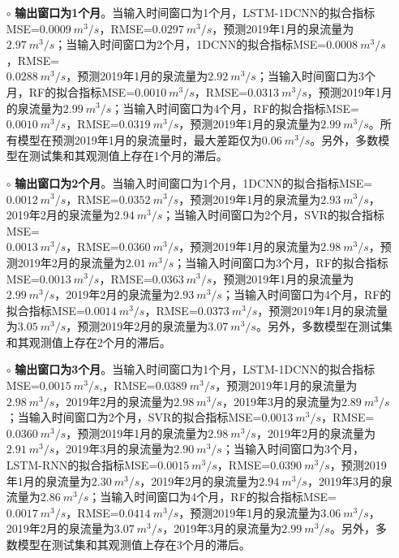 \begin{enumerate}
  \begin{itemize}
    \item[$\circ$] \textbf{输出窗口为1个月}。当输入时间窗口为1个月，LSTM-1DCNN的拟合指标MSE=$\SI{0.0009}{m^{3}/s}$，RMSE=$\SI{0.0297}{m^{3}/s}$，预测2019年1月的泉流量为$\SI{2.97}{m^{3}/s}$；当输入时间窗口为2个月，1DCNN的拟合指标MSE=$\SI{0.0008}{m^{3}/s}$，RMSE=\\$\SI{0.0288}{m^{3}/s}$，预测2019年1月的泉流量为$\SI{2.92}{m^{3}/s}$；当输入时间窗口为3个月，RF的拟合指标MSE=$\SI{0.0010}{m^{3}/s}$，RMSE=$\SI{0.0313}{m^{3}/s}$，预测2019年1月的泉流量为$\SI{2.99}{m^{3}/s}$；当输入时间窗口为4个月，RF的拟合指标MSE=$\SI{0.0010}{m^{3}/s}$，RMSE=$\SI{0.0319}{m^{3}/s}$，预测2019年1月的泉流量为$\SI{2.99}{m^{3}/s}$。所有模型在预测2019年1月的泉流量时，最大差距仅为$\SI{0.06}{m^{3}/s}$。另外，多数模型在测试集和其观测值上存在1个月的滞后。
    \item[$\circ$] \textbf{输出窗口为2个月}。当输入时间窗口为1个月，1DCNN的拟合指标MSE=\\$\SI{0.0012}{m^{3}/s}$，RMSE=$\SI{0.0352}{m^{3}/s}$，预测2019年1月的泉流量为$\SI{2.93}{m^{3}/s}$，2019年2月的泉流量为$\SI{2.94}{m^{3}/s}$；当输入时间窗口为2个月，SVR的拟合指标MSE=\\$\SI{0.0013}{m^{3}/s}$，RMSE=$\SI{0.0360}{m^{3}/s}$，预测2019年1月的泉流量为$\SI{2.98}{m^{3}/s}$，预测2019年2月的泉流量为$\SI{2.01}{m^{3}/s}$；当输入时间窗口为3个月，RF的拟合指标MSE=$\SI{0.0013}{m^{3}/s}$，RMSE=$\SI{0.0363}{m^{3}/s}$，预测2019年1月的泉流量为$\SI{2.99}{m^{3}/s}$，2019年2月的泉流量为$\SI{2.93}{m^{3}/s}$；当输入时间窗口为4个月，RF的拟合指标MSE=$\SI{0.0014}{m^{3}/s}$，RMSE=$\SI{0.0373}{m^{3}/s}$，预测2019年1月的泉流量为$\SI{3.05}{m^{3}/s}$，预测2019年2月的泉流量为$\SI{3.07}{m^{3}/s}$。另外，多数模型在测试集和其观测值上存在2个月的滞后。
    \item[$\circ$] \textbf{输出窗口为3个月}。当输入时间窗口为1个月，LSTM-1DCNN的拟合指标MSE=$\SI{0.0015}{m^{3}/s}$,，RMSE=$\SI{0.0389}{m^{3}/s}$，预测2019年1月的泉流量为$\SI{2.98}{m^{3}/s}$，2019年2月的泉流量为$\SI{2.98}{m^{3}/s}$，2019年3月的泉流量为$\SI{2.89}{m^{3}/s}$；当输入时间窗口为2个月，SVR的拟合指标MSE=$\SI{0.0013}{m^{3}/s}$，RMSE=$\SI{0.0360}{m^{3}/s}$，预测2019年1月的泉流量为$\SI{2.98}{m^{3}/s}$，2019年2月的泉流量为$\SI{2.91}{m^{3}/s}$，2019年3月的泉流量为$\SI{2.90}{m^{3}/s}$；当输入时间窗口为3个月，LSTM-RNN的拟合指标MSE=$\SI{0.0015}{m^{3}/s}$，RMSE=$\SI{0.0390}{m^{3}/s}$，预测2019年1月的泉流量为$\SI{2.30}{m^{3}/s}$，2019年2月的泉流量为$\SI{2.94}{m^{3}/s}$，2019年3月的泉流量为$\SI{2.86}{m^{3}/s}$；当输入时间窗口为4个月，RF的拟合指标MSE=$\SI{0.0017}{m^{3}/s}$，RMSE=$\SI{0.0414}{m^{3}/s}$，预测2019年1月的泉流量为$\SI{3.06}{m^{3}/s}$，2019年2月的泉流量为$\SI{3.07}{m^{3}/s}$，2019年3月的泉流量为$\SI{2.99}{m^{3}/s}$。另外，多数模型在测试集和其观测值上存在3个月的滞后。

\end{itemize}
\end{enumerate}
